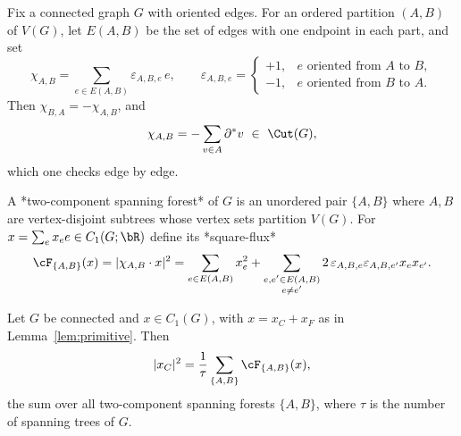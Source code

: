 
Fix a connected graph $G$ with oriented edges. For an ordered partition
$(A,B)$ of $V(G)$, let $E(A,B)$ be the set of edges with one endpoint in each
part, and set
\[
\chi_{A,B}=\sum_{e\in E(A,B)}\varepsilon_{A,B,e}\,e,\qquad
\varepsilon_{A,B,e}=\begin{cases}+1,& e \text{ oriented from } A \text{ to } B,\\ -1,& e \text{ oriented from } B \text{ to } A.\end{cases}
\]
Then $\chi_{B,A}=-\chi_{A,B}$, and
\begin{equation}\label{eq:chi}
\chi_{A,B}=-\sum_{v\in A}\partial^{*}v\ \in\ \Cut(G),
\end{equation}
which one checks edge by edge.

A *two-component spanning forest* of $G$ is an unordered pair $\{A,B\}$ where
$A,B$ are vertex-disjoint subtrees whose vertex sets partition $V(G)$. For
$x=\sum_e x_e e\in C_1(G;\bR)$ define its *square-flux*
\[
\cF_{\{A,B\}}(x)=|\chi_{A,B}\cdot x|^2
=\sum_{e\in E(A,B)}x_e^2+\sum_{\substack{e,e'\in E(A,B)\\ e\neq e'}}2\,\varepsilon_{A,B,e}\varepsilon_{A,B,e'}x_e x_{e'}.
\]

\begin{lem}\label{lem:length}
Let $G$ be connected and $x\in C_1(G)$, with $x=x_C+x_F$ as in
Lemma~\ref{lem:primitive}. Then
\[
|x_C|^2=\frac1\tau\sum_{\{A,B\}}\cF_{\{A,B\}}(x),
\]
the sum over all two-component spanning forests $\{A,B\}$, where $\tau$ is the
number of spanning trees of $G$.
\end{lem}

